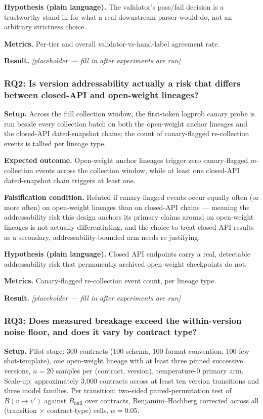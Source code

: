 \documentclass[11pt]{article}
\newcommand{\ph}{\textit{[placeholder --- fill in after experiments are run]}}
\begin{document}
\textbf{Hypothesis (plain language).} The validator's pass/fail decision is a trustworthy stand-in for what a real downstream parser would do, not an arbitrary strictness choice.

\textbf{Metrics.} Per-tier and overall validator-vs-hand-label agreement rate.

\textbf{Result.} \ph

\subsubsection{RQ2: Is version addressability actually a risk that differs between closed-API and open-weight lineages?}
\textbf{Setup.} Across the full collection window, the first-token logprob canary probe is run beside every collection batch on both the open-weight anchor lineages and the closed-API dated-snapshot chains; the count of canary-flagged re-collection events is tallied per lineage type.

\textbf{Expected outcome.} Open-weight anchor lineages trigger zero canary-flagged re-collection events across the collection window, while at least one closed-API dated-snapshot chain triggers at least one.

\textbf{Falsification condition.} Refuted if canary-flagged events occur equally often (or more often) on open-weight lineages than on closed-API chains --- meaning the addressability risk this design anchors its primary claims around on open-weight lineages is not actually differentiating, and the choice to treat closed-API results as a secondary, addressability-bounded arm needs re-justifying.

\textbf{Hypothesis (plain language).} Closed API endpoints carry a real, detectable addressability risk that permanently archived open-weight checkpoints do not.

\textbf{Metrics.} Canary-flagged re-collection event count, per lineage type.

\textbf{Result.} \ph

\subsubsection{RQ3: Does measured breakage exceed the within-version noise floor, and does it vary by contract type?}
\textbf{Setup.} Pilot stage: 300 contracts (100 schema, 100 format-convention, 100 few-shot-template), one open-weight lineage with at least three pinned successive versions, $n = 20$ samples per (contract, version), temperature-0 primary arm. Scale-up: approximately 3{,}000 contracts across at least ten version transitions and three model families. Per transition: two-sided paired-permutation test of $B(v{\to}v')$ against $B_{\text{null}}$ over contracts, Benjamini--Hochberg corrected across all (transition $\times$ contract-type) cells, $\alpha = 0.05$.
\end{document}
